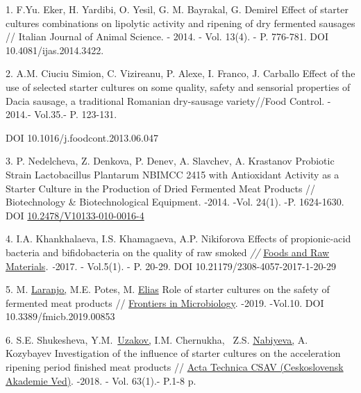 \begin{references}
1. F.Yu. Eker, H. Yardibi, O. Yesil, G. M. Bayrakal, G. Demirel Effect
of starter cultures combinations on lipolytic activity and ripening of
dry fermented sausages // Italian Journal of Animal Science. - 2014. -
Vol. 13(4). - P. 776-781. DOI 10.4081/ijas.2014.3422.

2. A.M. Ciuciu Simion, C. Vizireanu, P. Alexe, I. Franco, J. Carballo
Effect of the use of selected starter cultures on some quality, safety
and sensorial properties of Dacia sausage, a traditional Romanian
dry-sausage variety//Food Control. - 2014.- Vol.35.- P. 123-131.

DOI 10.1016/j.foodcont.2013.06.047

3. P. Nedelcheva, Z. Denkova, P. Denev, A. Slavchev, A. Krastanov
Probiotic Strain Lactobacillus Plantarum NBIMCC 2415 with Antioxidant
Activity as a Starter Culture in the Production of Dried Fermented Meat
Products // Biotechnology \& Biotechnological Equipment. -2014. -Vol.
24(1). -P. 1624-1630. DOI
\href{https://doi.org/10.2478/V10133-010-0016-4}{10.2478/V10133-010-0016-4}

4. I.A. Khankhalaeva, I.S. Khamagaeva, A.P. Nikiforova Effects of
propionic-acid bacteria and bifidobacteria on the quality of raw smoked
\emph{//}
\href{https://library.kazatu.kz:2057/sourceid/21100777291}{Foods and Raw
Materials}\emph{. -}2017. - Vol.5(1). - P. 20-29. DOI
10.21179/2308-4057-2017-1-20-29

5. M.
\href{https://library.kazatu.kz:2057/authid/detail.uri?origin=resultslist&authorId=7801545833&zone=}{Laranjo,}
M.E. Potes, M.
\href{https://library.kazatu.kz:2057/authid/detail.uri?origin=resultslist&authorId=35086070100&zone=}{Elias}
Role of starter cultures on the safety of fermented meat products //
\href{https://library.kazatu.kz:2057/sourceid/21100226442?origin=resultslist}{Frontiers
in Microbiology}. -2019. -Vol.10. DOI 10.3389/fmicb.2019.00853

6. S.E. Shukesheva,
Y.M.~\href{https://library.kazatu.kz:2057/authid/detail.uri?origin=resultslist&authorId=55968622400&zone=}{Uzakov,}
I.M. Chernukha, ~Z.S.
\href{https://library.kazatu.kz:2057/authid/detail.uri?origin=resultslist&authorId=56031451100&zone=}{Nabiyeva,}
A. Kozybayev Investigation of the influence of starter cultures on the
acceleration ripening period finished meat products //
\href{https://library.kazatu.kz:2057/sourceid/13884?origin=resultslist}{Acta
Technica CSAV (Ceskoslovensk Akademie Ved)}. -2018. - Vol. 63(1).- P.1-8
p.


\end{references}
